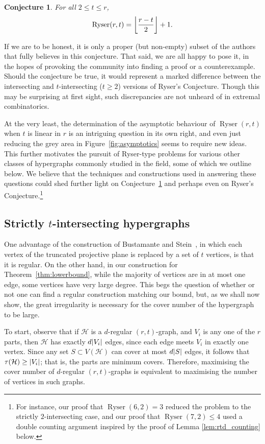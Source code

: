 \documentclass[a4paper,twoside,11pt]{article}
\DeclarePairedDelimiter{\floor}{\lfloor}{\rfloor}
\DeclarePairedDelimiter{\card}{|}{|}
\newtheorem{conj}[thm]{Conjecture}
\numberwithin{thm}{section}
\theoremstyle{definition}
\theoremstyle{remark}
\theoremstyle{definition}
\newcommand{\mc}[1]{\mathcal{#1}}
\DeclareMathOperator{\Ryser}{Ryser}
\begin{document}
\begin{conj} \label{conj:strong}
For all $2 \le t \le r$,
\[ \Ryser(r,t) = \floor*{\frac{r-t}{2}} + 1. \]
\end{conj}

If we are to be honest, it is only a proper (but non-empty) subset of the authors that fully believes in this conjecture.  That said, we are all happy to pose it, in the hopes of provoking the community into finding a proof or a counterexample.  Should the conjecture be true, it would represent a marked difference between the intersecting and $t$-intersecting ($t \ge 2$) versions of Ryser's Conjecture.  Though this may be surprising at first sight, such discrepancies are not unheard of in extremal combinatorics.

At the very least, the determination of the asymptotic behaviour of $\Ryser(r,t)$ when $t$ is linear in $r$ is an intriguing question in its own right, and even just reducing the grey area in Figure~\ref{fig:asymptotics} seems to require new ideas. This further motivates the pursuit of Ryser-type problems for various other classes of hypergraphs commonly studied in the field, some of which we outline below.  We believe that the techniques and constructions used in answering these questions could shed further light on Conjecture~\ref{conj:strong} and perhaps even on Ryser's Conjecture.\footnote{For instance, our proof that $\Ryser(6,2) = 3$ reduced the problem to the strictly $2$-intersecting case, and our proof that $\Ryser(7,2) \le 4$ used a double counting argument inspired by the proof of Lemma \ref{lem:rtd_counting} below.}

\subsection{Strictly $t$-intersecting hypergraphs} \label{sec:strictly}

One advantage of the construction of Bustamante and Stein~\cite{bustastein}, in which each vertex of the truncated projective plane is replaced by a set of $t$ vertices, is that it is regular. On the other hand, in our construction for Theorem~\ref{thm:lowerbound}, while the majority of vertices are in at most one edge, some vertices have very large degree. This begs the question of whether or not one can find a regular construction matching our bound, but, as we shall now show, the great irregularity is necessary for the cover number of the hypergraph to be large.

To start, observe that if $\mc H$ is a $d$-regular $(r,t)$-graph, and $V_i$ is any one of the $r$ parts, then $\mc H$ has exactly $d \card{V_i}$ edges, since each edge meets $V_i$ in exactly one vertex. Since any set $S \subset V(\mc H)$ can cover at most $d \card{S}$ edges, it follows that $\tau(\mc H) \ge \card{V_i}$; that is, the parts are minimum covers. Therefore, maximising the cover number of $d$-regular $(r,t)$-graphs is equivalent to maximising the number of vertices in such graphs.
\end{document}
